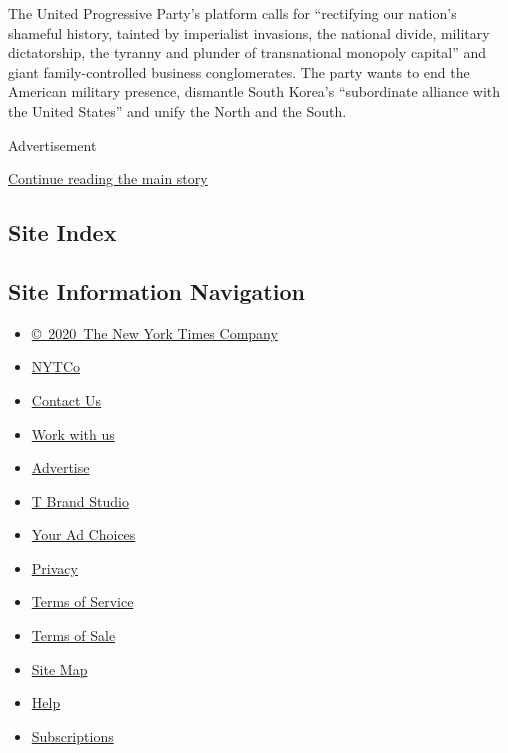 The United Progressive Party's platform calls for ``rectifying our
nation's shameful history, tainted by imperialist invasions, the
national divide, military dictatorship, the tyranny and plunder of
transnational monopoly capital'' and giant family-controlled business
conglomerates. The party wants to end the American military presence,
dismantle South Korea's ``subordinate alliance with the United States''
and unify the North and the South.

Advertisement

\protect\hyperlink{after-bottom}{Continue reading the main story}

\hypertarget{site-index}{%
\subsection{Site Index}\label{site-index}}

\hypertarget{site-information-navigation}{%
\subsection{Site Information
Navigation}\label{site-information-navigation}}

\begin{itemize}
\tightlist
\item
  \href{https://help.nytimes3xbfgragh.onion/hc/en-us/articles/115014792127-Copyright-notice}{©~2020~The
  New York Times Company}
\end{itemize}

\begin{itemize}
\tightlist
\item
  \href{https://www.nytco.com/}{NYTCo}
\item
  \href{https://help.nytimes3xbfgragh.onion/hc/en-us/articles/115015385887-Contact-Us}{Contact
  Us}
\item
  \href{https://www.nytco.com/careers/}{Work with us}
\item
  \href{https://nytmediakit.com/}{Advertise}
\item
  \href{http://www.tbrandstudio.com/}{T Brand Studio}
\item
  \href{https://www.nytimes3xbfgragh.onion/privacy/cookie-policy\#how-do-i-manage-trackers}{Your
  Ad Choices}
\item
  \href{https://www.nytimes3xbfgragh.onion/privacy}{Privacy}
\item
  \href{https://help.nytimes3xbfgragh.onion/hc/en-us/articles/115014893428-Terms-of-service}{Terms
  of Service}
\item
  \href{https://help.nytimes3xbfgragh.onion/hc/en-us/articles/115014893968-Terms-of-sale}{Terms
  of Sale}
\item
  \href{https://spiderbites.nytimes3xbfgragh.onion}{Site Map}
\item
  \href{https://help.nytimes3xbfgragh.onion/hc/en-us}{Help}
\item
  \href{https://www.nytimes3xbfgragh.onion/subscription?campaignId=37WXW}{Subscriptions}
\end{itemize}
